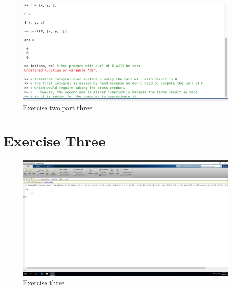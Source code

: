 \documentclass[11pt]{article}
\begin{document}
\begin{figure}[H]
	\includegraphics[width=\textwidth]{Prob2C}
	\caption*{Exercise  two part three}
\end{figure}

\section*{Exercise Three}
\begin{figure}[H]
	\includegraphics[width=\textwidth]{3}
	\caption*{Exercise three}
\end{figure}
\end{document}

